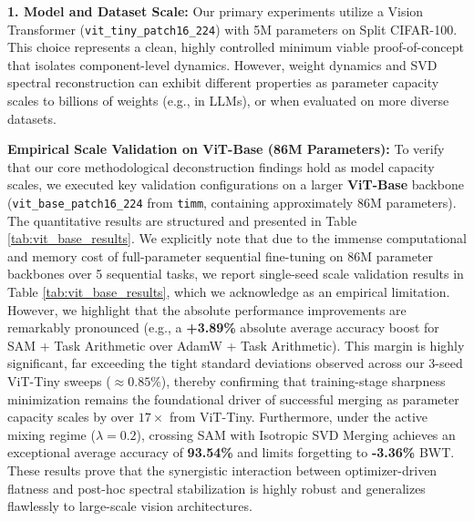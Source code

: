 \textbf{1. Model and Dataset Scale:} Our primary experiments utilize a Vision Transformer (\texttt{vit\_tiny\_patch16\_224}) with 5M parameters on Split CIFAR-100. This choice represents a clean, highly controlled minimum viable proof-of-concept that isolates component-level dynamics. However, weight dynamics and SVD spectral reconstruction can exhibit different properties as parameter capacity scales to billions of weights (e.g., in LLMs), or when evaluated on more diverse datasets.

\textbf{Empirical Scale Validation on ViT-Base (86M Parameters):} To verify that our core methodological deconstruction findings hold as model capacity scales, we executed key validation configurations on a larger \textbf{ViT-Base} backbone (\texttt{vit\_base\_patch16\_224} from \texttt{timm}, containing approximately 86M parameters). The quantitative results are structured and presented in Table \ref{tab:vit_base_results}. We explicitly note that due to the immense computational and memory cost of full-parameter sequential fine-tuning on 86M parameter backbones over 5 sequential tasks, we report single-seed scale validation results in Table \ref{tab:vit_base_results}, which we acknowledge as an empirical limitation. However, we highlight that the absolute performance improvements are remarkably pronounced (e.g., a \textbf{+3.89\%} absolute average accuracy boost for SAM + Task Arithmetic over AdamW + Task Arithmetic). This margin is highly significant, far exceeding the tight standard deviations observed across our 3-seed ViT-Tiny sweeps ($\approx 0.85\%$), thereby confirming that training-stage sharpness minimization remains the foundational driver of successful merging as parameter capacity scales by over $17\times$ from ViT-Tiny. Furthermore, under the active mixing regime ($\lambda=0.2$), crossing SAM with Isotropic SVD Merging achieves an exceptional average accuracy of \textbf{93.54\%} and limits forgetting to \textbf{-3.36\%} BWT. These results prove that the synergistic interaction between optimizer-driven flatness and post-hoc spectral stabilization is highly robust and generalizes flawlessly to large-scale vision architectures.

